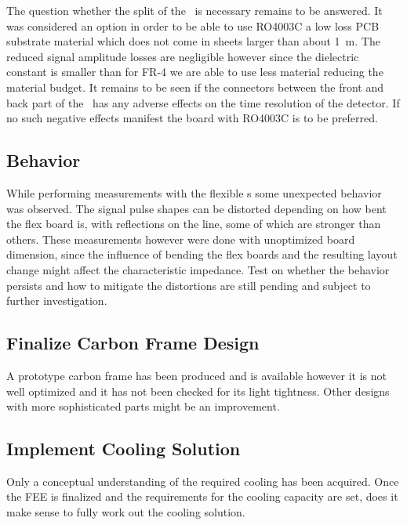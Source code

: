 \documentclass[../BTOF_summary.tex]{subfiles}
\begin{document}
The question whether the split of the \railboard\ is necessary remains to be answered.
It was considered an option in order to be able to use RO4003C a low loss PCB substrate material which does not come in sheets larger than about \SI{1}{m}.
The reduced signal amplitude losses are negligible however since the dielectric constant is smaller than for FR-4 we are able to use less material reducing the material budget.
It remains to be seen if the connectors between the front and back part of the \railboard\ has any adverse effects on the time resolution of the detector.
If no such negative effects manifest the board with RO4003C is to be preferred.

\subsection{\sensorboard Behavior}

While performing measurements with the flexible \sensorboard s some unexpected behavior was observed.
The signal pulse shapes can be distorted depending on how bent the flex board is, with reflections on the line, some of which are stronger than others.
These measurements however were done with unoptimized board dimension, since the influence of bending the flex boards and the resulting layout change might affect the characteristic impedance.
Test on whether the behavior persists and how to mitigate the distortions are still pending and subject to further investigation.

\subsection{Finalize Carbon Frame Design}
A prototype carbon frame has been produced and is available however it is not well optimized and it has not been checked for its light tightness.
Other designs with more sophisticated parts might be an improvement.

\subsection{Implement Cooling Solution}
Only a conceptual understanding of the required cooling has been acquired.
Once the FEE is finalized and the requirements for the cooling capacity are set, does it make sense to fully work out the cooling solution.
\end{document}
